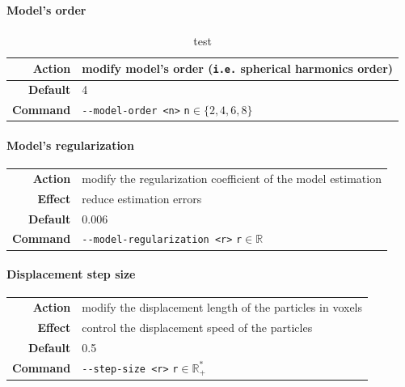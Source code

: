         \paragraph*{Model's order}
                \begin{table}
                    \centering
                    \caption{test}
                    \begin{tabular}{r|l}
                        \textbf{Action}  & modify model's order (\texttt{i.e.} spherical harmonics order)\\
                        \hline
                        \textbf{Default} & 4\\
                        \textbf{Command} & \texttt{-\hspace{0.1mm}-model-order <n>} \hfill \texttt{n}$\in\{2,4,6,8\}$
                    \end{tabular}
                \end{table}

        \paragraph*{Model's regularization}
            \begin{center}
                \begin{tabular}{rl}
                    \textbf{Action}  & modify the regularization coefficient of the model estimation\\
                    \textbf{Effect}  & reduce estimation errors\\
                    \textbf{Default} & 0.006\\
                    \textbf{Command} & \texttt{-\hspace{0.1mm}-model-regularization <r>} \hfill \texttt{r}$\in\mathbb{R}$
                \end{tabular}
            \end{center}

        \paragraph*{Displacement step size}
            \begin{center}
                \begin{tabular}{rl}
                    \textbf{Action}  & modify the displacement length of the particles in voxels\\
                    \textbf{Effect}  & control the displacement speed of the particles\\
                    \textbf{Default} & 0.5\\
                    \textbf{Command} & \texttt{-\hspace{0.1mm}-step-size <r>} \hfill \texttt{r}$\in\mathbb{R}_+^*$
                \end{tabular}
            \end{center}

